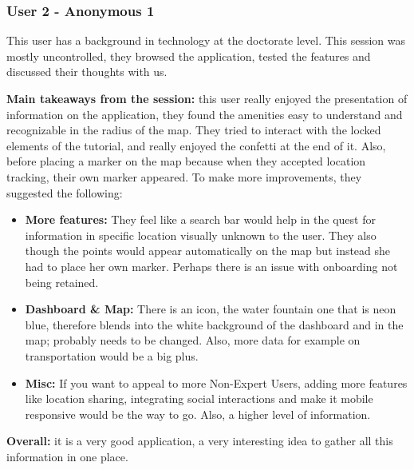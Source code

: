 \newpage

\subsubsection{User 2 - Anonymous 1}
This user has a background in technology at the doctorate level. This session
was mostly uncontrolled, they browsed the application, tested the features and
discussed their thoughts with us.

\textbf{Main takeaways from the session: } this user really enjoyed the
presentation of information on the application, they found the amenities easy to
understand and recognizable in the radius of the map. They tried to interact
with the locked elements of the tutorial, and really enjoyed the confetti at the
end of it. Also, before placing a marker on the map because when they accepted
location tracking, their own marker appeared. To make more improvements, they
suggested the following:
\begin{itemize}
    \item \textbf{More features: }They feel like a search bar would help in the
    quest for information in specific location visually unknown to the user.
    They also though the points would appear automatically on the map but
    instead she had to place her own marker. Perhaps there is an issue with
    onboarding not being retained.
    \vspace{0.2cm}

    \item \textbf{Dashboard \& Map: }There is an icon, the water fountain one
    that is neon blue, therefore blends into the white background of the
    dashboard and in the map; probably needs to be changed. Also, more data for
    example on transportation would be a big plus.
    \vspace{0.2cm}

    \item \textbf{Misc: } If you want to appeal to more Non-Expert Users, adding
    more features like location sharing, integrating social interactions and
    make it mobile responsive would be the way to go. Also, a higher level of
    information.
\end{itemize}
\textbf{Overall: }it is a very good application, a very interesting idea to
gather all this information in one place.

